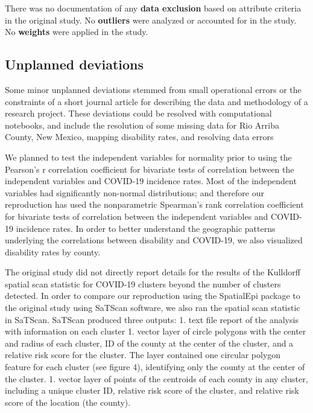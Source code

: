\documentclass[
]{article}
\begin{document}
There was no documentation of any \textbf{data exclusion} based on
attribute criteria in the original study. No \textbf{outliers} were
analyzed or accounted for in the study. No \textbf{weights} were applied
in the study.

\hypertarget{unplanned-deviations}{%
\subsection{Unplanned deviations}\label{unplanned-deviations}}

Some minor unplanned deviations stemmed from small operational errors or
the constraints of a short journal article for describing the data and
methodology of a research project. These deviations could be resolved
with computational notebooks, and include the resolution of some missing
data for Rio Arriba County, New Mexico, mapping disability rates, and
resolving data errors

We planned to test the independent variables for normality prior to
using the Pearson's r correlation coefficient for bivariate tests of
correlation between the independent variables and COVID-19 incidence
rates. Most of the independent variables had significantly non-normal
distributions; and therefore our reproduction has used the nonparametric
Spearman's rank correlation coefficient for bivariate tests of
correlation between the independent variables and COVID-19 incidence
rates. In order to better understand the geographic patterns underlying
the correlations between disability and COVID-19, we also visualized
disability rates by county.

The original study did not directly report details for the results of
the Kulldorff spatial scan statistic for COVID-19 clusters beyond the
number of clusters detected. In order to compare our reproduction using
the SpatialEpi package to the original study using SaTScan software, we
also ran the spatial scan statistic in SaTScan. SaTScan produced three
outputs: 1. text file report of the analysis with information on each
cluster 1. vector layer of circle polygons with the center and radius of
each cluster, ID of the county at the center of the cluster, and a
relative risk score for the cluster. The layer contained one circular
polygon feature for each cluster (see figure 4), identifying only the
county at the center of the cluster. 1. vector layer of points of the
centroids of each county in any cluster, including a unique cluster ID,
relative risk score of the cluster, and relative risk score of the
location (the county).
\end{document}

